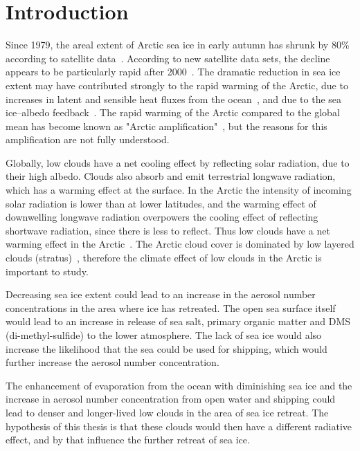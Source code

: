 \chapter{Introduction}
\label{chap:introduction}
Since 1979, the areal extent of Arctic sea ice in early autumn has shrunk by 80\% according to satellite data~\citep{NSIDC}. According to new satellite data sets, the decline appears to be particularly rapid after 2000~\citep{Wu2012}. The dramatic reduction in sea ice extent may have contributed strongly to the rapid warming of the Arctic, due to increases in latent and sensible heat fluxes from the ocean~\citep{Screen2010}, and due to the sea ice--albedo feedback~\citep{Curry1995a}. The rapid warming of the Arctic compared to the global mean has become known as "Arctic amplification"~\citep{Graversen2008}, but the reasons for this amplification are not fully understood.

Globally, low clouds have a net cooling effect by reflecting solar radiation, due to their high albedo. Clouds also absorb and emit terrestrial longwave radiation, which has a warming effect at the surface. In the Arctic the intensity of incoming solar radiation is lower than at lower latitudes, and the warming effect of downwelling longwave radiation overpowers the cooling effect of reflecting shortwave radiation, since there is less to reflect. Thus low clouds have a net warming effect in the Arctic~\citep{Shupe2004}. The Arctic cloud cover is dominated by low layered clouds (stratus)~\citep{Curry1996}, therefore the climate effect of low clouds in the Arctic is important to study.

Decreasing sea ice extent could lead to an increase in the aerosol number concentrations in the area where ice has retreated. The open sea surface itself would lead to an increase in release of sea salt, primary organic matter and DMS (di-methyl-sulfide) to the lower atmosphere. The lack of sea ice would also increase the likelihood that the sea could be used for shipping, which would further increase the aerosol number concentration.

The enhancement of evaporation from the ocean with diminishing sea ice and the increase in aerosol number concentration from open water and shipping could lead to denser and longer-lived low clouds in the area of sea ice retreat. The  hypothesis of this thesis is that these clouds would then have a different radiative effect, and by that influence the further retreat of sea ice.

